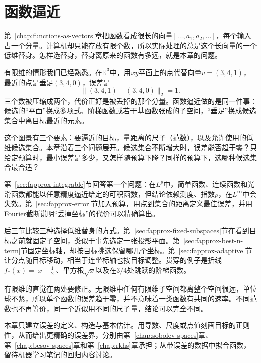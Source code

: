 \chapter{函数逼近}
\label{chap:function-approximation}

第~\ref{chap:functions-as-vectors}章把函数看成很长的向量$[\ldots,a_1,a_2,\ldots]$，每个输入占一个分量。计算机却只能存放有限个数，所以实际处理的总是这个长向量的一个低维替身。怎样选替身，替身离原来的函数有多远，就是本章的问题。

有限维的情形我们已经熟悉。在$\mathbb R^3$中，用$xy$平面上的点代替向量$v=(3,4,1)$，最近的点是垂足$(3,4,0)$，误差是
\[
 \lVert(3,4,1)-(3,4,0)\rVert_2=1 .
\]
三个数被压缩成两个，代价正好是被丢掉的那个分量。函数逼近做的是同一件事：候选的“平面”换成多项式、阶梯函数或若干基函数张成的子空间，“垂足”换成候选集合中离目标最近的元素。

这个图景有三个要素：要逼近的目标，量距离的尺子（范数），以及允许使用的低维候选集合。本章沿着三个问题展开。候选集合不断增大时，误差能否趋于零？只给定预算时，最小误差是多少，又怎样随预算下降？同样的预算下，选哪种候选集合最合适？

第~\ref{sec:fapprox-integrable}节回答第一个问题：在$L^p$中，简单函数、连续函数和光滑函数都能以任意精度逼近给定的可积函数，但结论依赖测度、指数$p$，在$L^\infty$中会失效。第~\ref{sec:fapprox-error}节加入预算，用点到集合的距离定义最佳误差，并用Fourier截断说明“丢掉坐标”的代价可以精确算出。

后三节比较三种选择低维替身的方式。第~\ref{sec:fapprox-fixed-subspaces}节在看到目标之前就固定子空间，类似于事先选定一张投影平面。第~\ref{sec:fapprox-best-n-term}节固定坐标轴，却按目标挑选保留哪几个坐标。第~\ref{sec:fapprox-adaptive}节让分点随目标移动，相当于连坐标轴也按目标调整。贯穿的例子是折线$f_*(x)=\lvert x-\frac12\rvert$、平方根$\sqrt x$以及在$3/4$处跳跃的阶梯函数。

有限维的直觉在两处要修正。无限维中任何有限维子空间都离整个空间很远，单位球不紧，所以单个函数的误差趋于零，并不意味着一类函数有共同的速率。不同范数也不再等价，同一个近似用不同的尺子量，结论可以完全不同。

本章只建立误差的定义、构造与基本估计。用导数、尺度或点值刻画目标的正则性，从而给出更精确的误差界，分别由第~\ref{chap:sobolev-spaces}章、第~\ref{chap:besov-spaces}章和第~\ref{chap:rkhs}章承担；从带误差的数据中拟合函数，留待机器学习笔记的回归内容讨论。








